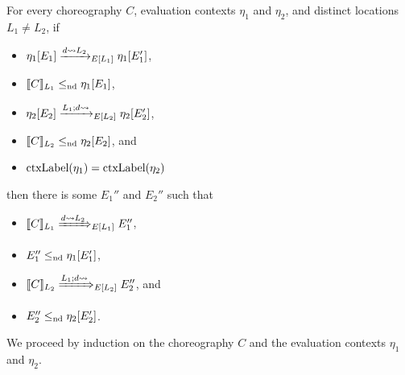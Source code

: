 \begin{lem}
\label{lem:choice-control-lowering}
For every choreography $C$, evaluation contexts $\eta_1$ and $\eta_2$, and distinct locations $L_1 \neq L_2$, if
\begin{itemize}
  \item $\eta_1[E_1] \ctrlreduceloc[d \sendsto L_2]{L_1} \eta_1[E_1']$,
  \item $\llbracket C\rrbracket_{L_1} \leq_{\text{nd}} \eta_1[E_1]$,
  \item $\eta_2[E_2] \ctrlreduceloc[L_1;d \sendsto]{L_2} \eta_2[E_2']$,
  \item $\llbracket C\rrbracket_{L_2} \leq_{\text{nd}} \eta_2[E_2]$, and
  \item $\text{ctxLabel}({\eta_1}) = \text{ctxLabel}({\eta_2})$
\end{itemize}
then there is some $E_1''$ and $E_2''$ such that
\begin{itemize}
  \item $\epp{C}{L_1} \ctrlsteploc[d \sendsto L_2]{L_1} E_1''$,
  \item $E_1'' \leq_{\text{nd}} \eta_1[E_1']$,
  \item $\epp{C}{L_2} \ctrlsteploc[L_1;d \sendsto]{L_2} E_2''$, and
  \item $E_2'' \leq_{\text{nd}} \eta_2[E_2']$.
\end{itemize}
\end{lem}
We proceed by induction on the choreography $C$ and the evaluation contexts $\eta_1$ and $\eta_2$.
